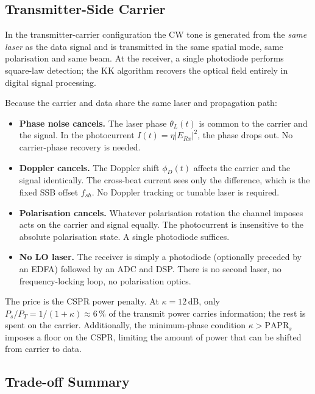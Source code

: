 \subsection{Transmitter-Side Carrier}

In the transmitter-carrier configuration the CW tone is generated from the \emph{same laser} as the data signal and is transmitted in the same spatial mode, same polarisation and same beam. At the receiver, a single photodiode performs square-law detection; the KK algorithm recovers the optical field entirely in digital signal processing.

Because the carrier and data share the same laser and propagation path:

\begin{itemize}
\item \textbf{Phase noise cancels.} The laser phase $\theta_L(t)$ is common to the carrier and the signal. In the photocurrent $I(t)=\eta|E_{Rx}|^2$, the phase drops out. No carrier-phase recovery is needed.

\item \textbf{Doppler cancels.} The Doppler shift $\phi_D(t)$ affects the carrier and the signal identically. The cross-beat current sees only the difference, which is the fixed SSB offset $f_{sh}$. No Doppler tracking or tunable laser is required.

\item \textbf{Polarisation cancels.} Whatever polarisation rotation the channel imposes acts on the carrier and signal equally. The photocurrent is insensitive to the absolute polarisation state. A single photodiode suffices.

\item \textbf{No LO laser.} The receiver is simply a photodiode (optionally preceded by an EDFA) followed by an ADC and DSP. There is no second laser, no frequency-locking loop, no polarisation optics.
\end{itemize}

The price is the CSPR power penalty. At $\kappa=12$\,dB, only $P_s/P_T=1/(1+\kappa)\approx6\,\%$ of the transmit power carries information; the rest is spent on the carrier. Additionally, the minimum-phase condition $\kappa>\mathrm{PAPR}_s$ imposes a floor on the CSPR, limiting the amount of power that can be shifted from carrier to data.

\subsection{Trade-off Summary}

